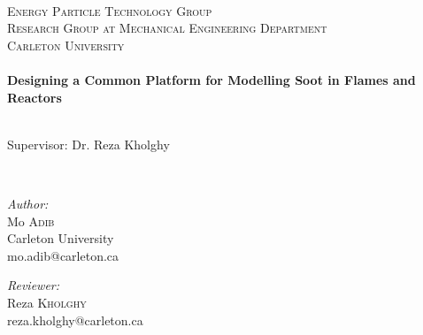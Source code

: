 \begin{titlepage}
\begin{center}

\newcommand{\myTitle}{Designing a Common Platform for Modelling Soot in Flames and Reactors}
\newcommand{\thisYear}{2023}



~\\[0.6cm]
\textsc{\LARGE Energy Particle Technology Group}\\[0.6cm]	
\textsc{Research Group at Mechanical Engineering Department }\\
\textsc{Carleton University}\\[0.6cm]	

\HRule \\[0.5cm]
{ \huge \bfseries \myTitle}\\[0.2cm]
\HRule \\[1cm]

\begin{minipage}{0.35\textwidth}
Supervisor: Dr. Reza Kholghy\\
\end{minipage}\\[1.0cm]

\begin{minipage}{0.4\textwidth}
\begin{flushleft} \large
\emph{Author:}\\
    Mo \textsc{Adib}\\
    Carleton University\\
    mo.adib@carleton.ca
\end{flushleft}
\end{minipage}
\begin{minipage}{0.4\textwidth}
\begin{flushright} \large
\emph{Reviewer:} \\
Reza \textsc{Kholghy}\\
reza.kholghy@carleton.ca\\
\end{flushright}
\end{minipage}


\end{center}
\end{titlepage}
